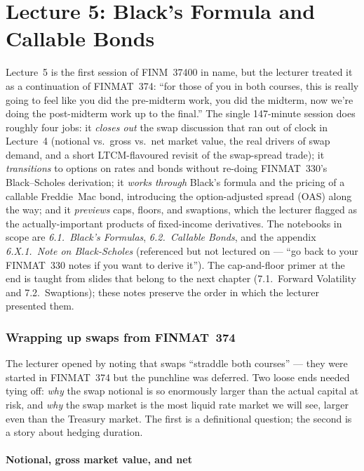 \part*{Lecture 5: Black's Formula and Callable Bonds}

Lecture~5 is the first session of FINM~37400 in name, but the lecturer
treated it as a continuation of FINMAT~374: ``for those of you in both
courses, this is really going to feel like you did the pre-midterm work,
you did the midterm, now we're doing the post-midterm work up to the
final.'' The single 147-minute session does roughly four jobs: it
\emph{closes out} the swap discussion that ran out of clock in
Lecture~4 (notional vs.\ gross vs.\ net market value, the real drivers
of swap demand, and a short LTCM-flavoured revisit of the swap-spread
trade); it \emph{transitions} to options on rates and bonds without
re-doing FINMAT~330's Black--Scholes derivation; it \emph{works through}
Black's formula and the pricing of a callable Freddie~Mac bond,
introducing the option-adjusted spread (OAS) along the way; and it
\emph{previews} caps, floors, and swaptions, which the lecturer flagged
as the actually-important products of fixed-income derivatives. The
notebooks in scope are \emph{6.1.~Black's Formulas}, \emph{6.2.~Callable
Bonds}, and the appendix \emph{6.X.1.~Note on Black-Scholes} (referenced
but not lectured on --- ``go back to your FINMAT~330 notes if you want
to derive it''). The cap-and-floor primer at the end is taught from
slides that belong to the next chapter (7.1.~Forward Volatility and
7.2.~Swaptions); these notes preserve the order in which the lecturer
presented them.

\section{Wrapping up swaps from FINMAT~374}\label{L5-sec:swaps-wrap}

The lecturer opened by noting that swaps ``straddle both courses'' ---
they were started in FINMAT~374 but the punchline was deferred. Two
loose ends needed tying off: \emph{why} the swap notional is so
enormously larger than the actual capital at risk, and \emph{why} the
swap market is the most liquid rate market we will see, larger even
than the Treasury market. The first is a definitional question; the
second is a story about hedging duration.

\subsection{Notional, gross market value, and net}\label{L5-sec:swaps-notional}

